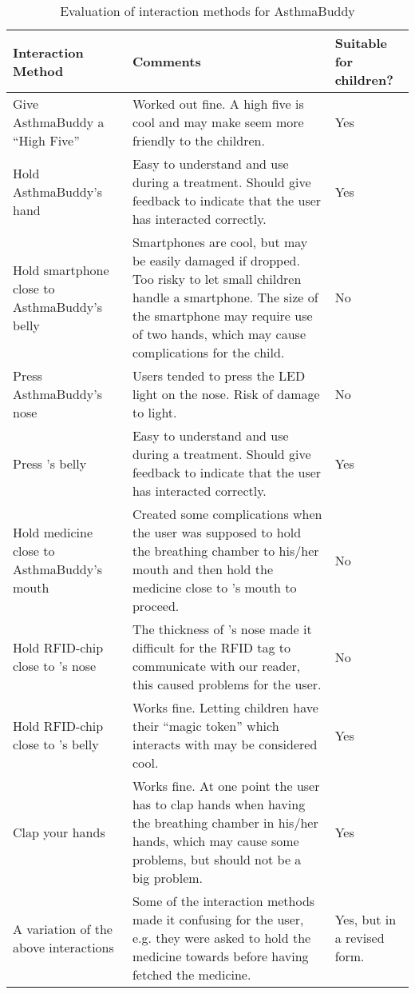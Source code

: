\begin{onehalfspacing}
\begin{table}[H]
\centering
\begin{tabular}{|p{3.5cm} | p{7.6cm} | p{2.2cm} |}
\hline 
\textbf{Interaction Method} & \textbf{Comments} & \textbf{Suitable for children?}\\
\hline
	Give AsthmaBuddy a ``High Five'' & Worked out fine. A high five is cool and may make \ab{} seem more friendly to the children. & Yes \\
\hline
	Hold AsthmaBuddy's hand & Easy to understand and use during a treatment. Should give feedback to indicate that the user has interacted correctly. & Yes\\
\hline
	Hold smartphone close to AsthmaBuddy's belly & Smartphones are cool, but may be easily damaged if dropped. Too risky to let small children handle a smartphone. The size of the smartphone may require use of two hands, which may cause complications for the child. & No \\
\hline
	Press AsthmaBuddy's nose & Users tended to press the LED light on the nose. Risk of damage to light. & No\\
\hline
	Press \buddy{}'s belly & Easy to understand and use during a treatment. Should give feedback to indicate that the user has interacted correctly. & Yes\\
\hline
	Hold medicine close to AsthmaBuddy's mouth & Created some complications when the user was supposed to hold the breathing chamber to his/her mouth and then hold the medicine close to \ab{}'s mouth to proceed. & No \\
\hline
	Hold RFID-chip close to \buddy{}'s nose & The thickness of \buddy{}'s nose made it difficult for the RFID tag to communicate with our reader, this caused problems for the user. & No \\
\hline
	Hold RFID-chip close to \buddy{}'s belly & Works fine. Letting children have their ``magic token'' which interacts with \ab{} may be considered cool. & Yes\\
\hline
	Clap your hands & Works fine. At one point the user has to clap hands when having the breathing chamber in his/her hands, which may cause some problems, but should not be a big problem. & Yes\\
\hline
	A variation of the above interactions & Some of the interaction methods made it confusing for the user, e.g. they were asked to hold the medicine towards \ab{} before having fetched the medicine. & Yes, but in a revised form.\\
\hline
\end{tabular}
\caption{Evaluation of interaction methods for AsthmaBuddy}
\label{tab:interactioneval}
\end{table}
\end{onehalfspacing}


